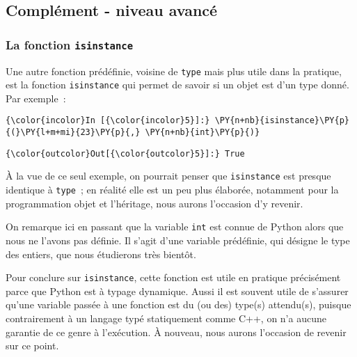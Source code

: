     \hypertarget{compluxe9ment---niveau-avancuxe9}{%
\subsection{Complément - niveau
avancé}\label{compluxe9ment---niveau-avancuxe9}}

    \hypertarget{la-fonction-isinstance}{%
\subsubsection{\texorpdfstring{La fonction
\texttt{isinstance}}{La fonction isinstance}}\label{la-fonction-isinstance}}

    Une autre fonction prédéfinie, voisine de \texttt{type} mais plus utile
dans la pratique, est la fonction \texttt{isinstance} qui permet de
savoir si un objet est d'un type donné. Par exemple~:

    \begin{Verbatim}[commandchars=\\\{\},frame=single,framerule=0.3mm,rulecolor=\color{cellframecolor}]
{\color{incolor}In [{\color{incolor}5}]:} \PY{n+nb}{isinstance}\PY{p}{(}\PY{l+m+mi}{23}\PY{p}{,} \PY{n+nb}{int}\PY{p}{)}
\end{Verbatim}


\begin{Verbatim}[commandchars=\\\{\},frame=single,framerule=0.3mm,rulecolor=\color{cellframecolor}]
{\color{outcolor}Out[{\color{outcolor}5}]:} True
\end{Verbatim}
            
    À la vue de ce seul exemple, on pourrait penser que \texttt{isinstance}
est presque identique à \texttt{type}~; en réalité elle est un peu plus
élaborée, notamment pour la programmation objet et l'héritage, nous
aurons l'occasion d'y revenir.

    On remarque ici en passant que la variable \texttt{int} est connue de
Python alors que nous ne l'avons pas définie. Il s'agit d'une variable
prédéfinie, qui désigne le type des entiers, que nous étudierons très
bientôt.

    Pour conclure sur \texttt{isinstance}, cette fonction est utile en
pratique précisément parce que Python est à typage dynamique. Aussi il
est souvent utile de s'assurer qu'une variable passée à une fonction est
du (ou des) type(s) attendu(s), puisque contrairement à un langage typé
statiquement comme C++, on n'a aucune garantie de ce genre à
l'exécution. À nouveau, nous aurons l'occasion de revenir sur ce point.


    
    
    
